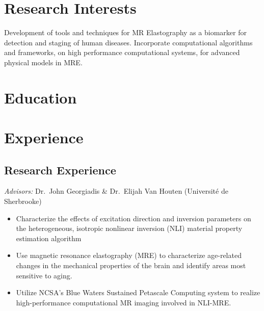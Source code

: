 \documentclass[11pt,letterpaper,sans]{moderncv}
\begin{document}

\maketitle

\section{Research Interests}

Development of tools and techniques for MR Elastography as a biomarker for detection and staging of human diseases.
Incorporate computational algorithms and frameworks, on high performance computational systems, for advanced physical models in MRE.

\section{Education}





\section{Experience}

\subsection{Research Experience}

%
  {\textit{Advisors:} Dr.\ John Georgiadis \& Dr.\ Elijah Van Houten (Universit\'{e} de Sherbrooke)
  \begin{itemize}
	\item Characterize the effects of excitation direction and inversion parameters on the heterogeneous, isotropic nonlinear inversion (NLI) material property estimation algorithm
  	\item Use magnetic resonance elastography (MRE) to characterize age-related changes in the mechanical properties of the brain and identify areas most sensitive to aging.
	\item Utilize NCSA's Blue Waters Sustained Petascale Computing system to realize high-performance computational MR imaging involved in NLI-MRE.
  \end{itemize}
  }
\end{document}
